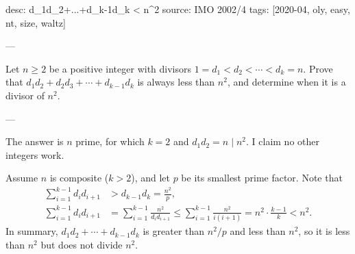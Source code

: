 desc: d_1d_2+...+d_{k-1}d_k < n^2
source: IMO 2002/4
tags: [2020-04, oly, easy, nt, size, waltz]

---

Let $n\ge2$ be a positive integer with divisors $1=d_1<d_2<\cdots<d_k=n$. Prove that $d_1d_2+d_2d_3+\cdots+d_{k-1}d_k$ is always less than $n^2$, and determine when it is a divisor of $n^2$.

---

The answer is $n$ prime, for which $k=2$ and $d_1d_2=n\mid n^2$. I claim no other integers work.

Assume $n$ is composite ($k>2$), and let $p$ be its smallest prime factor. Note that
\begin{align*}
    \sum_{i=1}^{k-1}d_id_{i+1}&>d_{k-1}d_k=\frac{n^2}p,\\
    \sum_{i=1}^{k-1}d_id_{i+1}&=\sum_{i=1}^{k-1}\frac{n^2}{d_id_{i+1}}\le\sum_{i=1}^{k-1}\frac{n^2}{i(i+1)}=n^2\cdot\frac{k-1}k<n^2.
\end{align*}
In summary, $d_1d_2+\cdots+d_{k-1}d_k$ is greater than $n^2/p$ and less than $n^2$, so it is less than $n^2$ but does not divide $n^2$.
